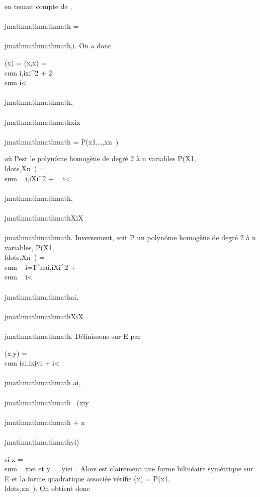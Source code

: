 en tenant compte de \omegai,\\\\jmathmathmathmath = \omega\\\\jmathmathmathmath,i. On a donc

\Phi(x) = \phi(x,x) = \\sum
i\omegai,ixi^2 +
2\\sum
i\textless{}\\\\jmathmathmathmath\omegai,\\\\jmathmathmathmathxix\\\\jmathmathmathmath =
P\Phi(x1,\ldots,xn~)

où P\Phi est le polynôme homogène de degré 2 à n variables
P\Phi(X1,\\ldots,Xn~)
= \\sum ~
i\omegai,iXi^2 +\
\sum ~
i\textless{}\\\\jmathmathmathmath\omegai,\\\\jmathmathmathmathXiX\\\\jmathmathmathmath.
Inversement, soit P un polynôme homogène de degré 2 à n variables,
P(X1,\\ldots,Xn~)
= \\sum ~
i=1^nai,iXi^2
+ \\sum ~
i\textless{}\\\\jmathmathmathmathai,\\\\jmathmathmathmathXiX\\\\jmathmathmathmath. Définissons
\phi sur E par

\phi(x,y) = \\sum
iai,ixiyi +
\sum i\textless{}\\\\jmathmathmathmath ai,\\\\jmathmathmathmath~
\over 2 (xiy\\\\jmathmathmathmath +
x\\\\jmathmathmathmathyi)

si x = \\sum ~
xiei et y =\
\sum  yiei~. Alors \phi est
clairement une forme bilinéaire symétrique sur E et la forme quadratique
associée vérifie \Phi(x) =
P(x1,\\ldots,xn~).
On obtient donc

